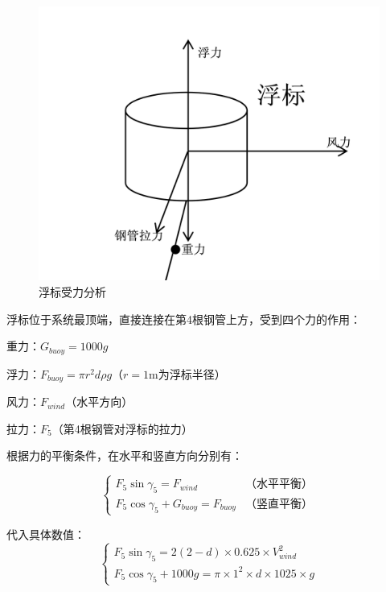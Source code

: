 \documentclass[withoutpreface,bwprint]{cumcmthesis}
\begin{document}
\begin{minipage}{0.45\textwidth}
\begin{figure}[H]
\centering
\includegraphics[width=\linewidth]{figures/浮标受力分析.png}
\caption{浮标受力分析}
\label{fig:浮标受力}
\end{figure}
\end{minipage}
\hfill
\begin{minipage}{0.52\textwidth}
浮标位于系统最顶端，直接连接在第4根钢管上方，受到四个力的作用：

重力：$G_{buoy}=1000g$ 

浮力：$F_{buoy}=\pi r^2 d \rho g$（$r=1$m为浮标半径）

风力：$F_{wind}$（水平方向）

拉力：$F_5$（第4根钢管对浮标的拉力）


根据力的平衡条件，在水平和竖直方向分别有：

\end{minipage}

\begin{equation}
\label{eq:浮标平衡详细}
\begin{cases}
F_5\sin\gamma_5 = F_{wind} & \text{（水平平衡）} \\
F_5\cos\gamma_5 + G_{buoy} = F_{buoy} & \text{（竖直平衡）}
\end{cases}
\end{equation}

代入具体数值：
\begin{equation}
\begin{cases}
F_5\sin\gamma_5 = 2(2-d) \times 0.625 \times V_{wind}^2 \\
F_5\cos\gamma_5 + 1000g = \pi \times 1^2 \times d \times 1025 \times g
\end{cases}
\end{equation}
\end{document}
